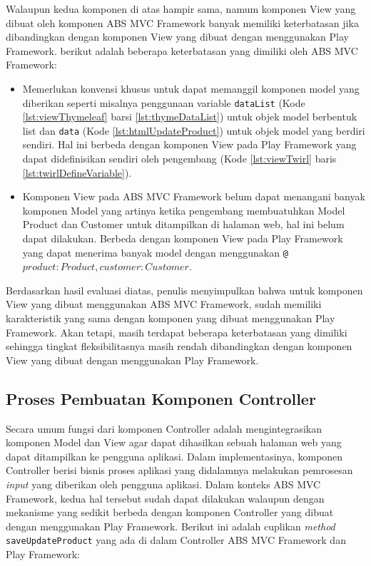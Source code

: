 Walaupun kedua komponen di atas hampir sama, namum komponen View yang dibuat oleh komponen ABS MVC Framework banyak memiliki keterbatasan jika dibandingkan dengan komponen View yang dibuat dengan menggunakan Play Framework. berikut adalah beberapa keterbatasan yang dimiliki oleh ABS MVC Framework:

\begin{itemize}
    \item Memerlukan konvensi khusus untuk dapat memanggil komponen model yang diberikan seperti misalnya penggunaan variable \texttt{dataList} (Kode \ref{lst:viewThymeleaf} barsi \ref{lst:thymeDataList}) untuk objek model berbentuk list dan \texttt{data} (Kode \ref{lst:htmlUpdateProduct}) untuk objek model yang berdiri sendiri. Hal ini berbeda dengan komponen View pada Play Framework yang dapat didefinisikan sendiri oleh pengembang (Kode \ref{lst:viewTwirl} baris \ref{lst:twirlDefineVariable}).
    \item Komponen View pada ABS MVC Framework belum dapat menangani banyak komponen Model yang artinya ketika pengembang membuatuhkan Model Product dan Customer untuk ditampilkan di halaman web,  hal ini belum dapat dilakukan. Berbeda dengan komponen View pada Play Framework yang dapat menerima banyak model dengan menggunakan \texttt{@\(product: Product, customer: Customer\)}.
\end{itemize}

Berdasarkan hasil evaluasi diatas, penulis menyimpulkan bahwa untuk komponen View yang dibuat menggunakan ABS MVC Framework, sudah memiliki karakteristik yang sama dengan komponen yang dibuat menggunakan Play Framework. Akan tetapi, masih terdapat beberapa keterbatasan yang dimiliki sehingga tingkat fleksibilitasnya masih rendah dibandingkan dengan komponen View yang dibuat dengan menggunakan Play Framework.

\subsection{Proses Pembuatan Komponen Controller}

Secara umum fungsi dari komponen Controller adalah mengintegrasikan komponen Model dan View agar dapat dihasilkan sebuah halaman web yang dapat ditampilkan ke pengguna aplikasi. Dalam implementasinya, komponen Controller berisi bisnis proses aplikasi yang didalamnya melakukan pemrosesan \textit{input} yang diberikan oleh pengguna aplikasi. Dalam konteks ABS MVC Framework, kedua hal tersebut sudah dapat dilakukan walaupun dengan mekanisme yang sedikit berbeda dengan komponen Controller yang dibuat dengan menggunakan Play Framework. Berikut ini adalah cuplikan \textit{method} \texttt{saveUpdateProduct} yang ada di dalam Controller ABS MVC Framework dan Play Framework:

